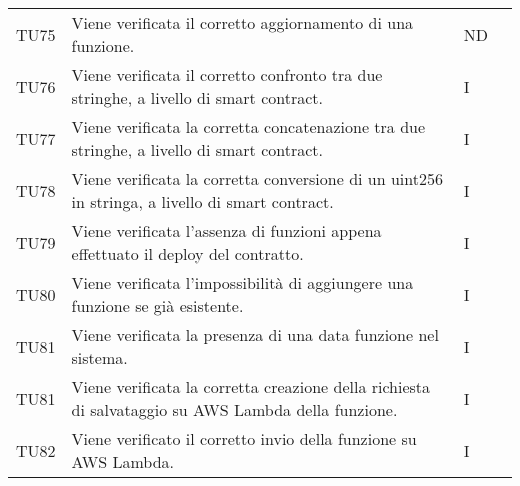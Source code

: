 \begin{longtable}{|C{1.5cm}|C{8cm}|C{3cm}|C{1cm}|}
	TU75 &
	Viene verificata il corretto aggiornamento di una funzione.  &
	ND \\

	TU76 &
	Viene verificata il corretto confronto tra due stringhe, a livello di smart contract.  &
	I \\

	TU77 &
	Viene verificata la corretta concatenazione tra due stringhe, a livello di smart contract.  &
	I \\

	TU78 &
	Viene verificata la corretta conversione di un uint256 in stringa, a livello di smart contract.  &
	I \\

	TU79 &
	Viene verificata l'assenza di funzioni appena effettuato il deploy del contratto.  &
	I \\

	TU80 &
	Viene verificata l'impossibilità di aggiungere una funzione se già esistente.  &
	I \\

	TU81 &
	Viene verificata la presenza di una data funzione nel sistema.  &
	I \\

	TU81 &
	Viene verificata la corretta creazione della richiesta di salvataggio su AWS Lambda della funzione.  &
	I \\

	TU82 &
	Viene verificato il corretto invio della funzione su AWS Lambda.  &
	I \\


\end{longtable}
